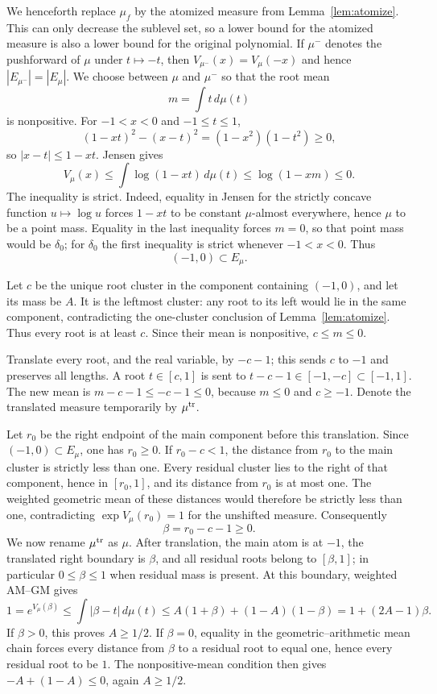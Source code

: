 \documentclass[11pt]{article}
\numberwithin{equation}{section}
\theoremstyle{plain}
\theoremstyle{definition}
\theoremstyle{remark}
\newcommand{\1}{\mathbf 1}
\newcommand{\dd}{\,d}
\begin{document}
We henceforth replace $\mu_f$ by the atomized measure from
Lemma~\ref{lem:atomize}.  This can only decrease the sublevel set, so a
lower bound for the atomized measure is also a lower bound for the original
polynomial.  If $\mu^{-}$ denotes the pushforward of $\mu$ under
$t\mapsto-t$, then $V_{\mu^-}(x)=V_\mu(-x)$ and hence
$|E_{\mu^-}|=|E_\mu|$.  We choose between $\mu$ and $\mu^-$ so that the
root mean
\[
 m=\int t\dd\mu(t)
\]
is nonpositive.  For
$-1<x<0$ and $-1\le t\le1$,
\[
 (1-xt)^2-(x-t)^2=(1-x^2)(1-t^2)\ge0,
\]
so $|x-t|\le1-xt$.  Jensen gives
\[
 V_\mu(x)\le\int\log(1-xt)\dd\mu(t)
 \le\log(1-xm)\le0.
\]
The inequality is strict.  Indeed, equality in Jensen for the strictly
concave function $u\mapsto\log u$ forces $1-xt$ to be constant
$\mu$-almost everywhere, hence $\mu$ to be a point mass.  Equality in the
last inequality forces $m=0$, so that point mass would be $\delta_0$; for
$\delta_0$ the first inequality is strict whenever $-1<x<0$.
Thus
\[
 (-1,0)\subset E_\mu.
\]

Let $c$ be the unique root cluster in the component containing
$(-1,0)$, and let its mass be $A$.  It is the leftmost cluster: any root
to its left would lie in the same component, contradicting the one-cluster
conclusion of Lemma~\ref{lem:atomize}.  Thus every root is at least $c$.
Since their mean is nonpositive, $c\le m\le0$.

Translate every root, and the real variable, by $-c-1$; this sends $c$ to
$-1$ and preserves all lengths.  A root $t\in[c,1]$ is sent to
$t-c-1\in[-1,-c]\subset[-1,1]$.  The new mean is
$m-c-1\le -c-1\le0$, because $m\le0$ and $c\ge-1$.  Denote the translated
measure temporarily by $\mu^{\rm tr}$.

Let $r_0$ be the right endpoint of the main component before this
translation.  Since $(-1,0)\subset E_\mu$, one has
$r_0\ge0$.  If $r_0-c<1$, the distance from $r_0$ to the main cluster is
strictly less than one.  Every residual cluster lies to the right of that
component, hence in $[r_0,1]$, and its distance from $r_0$ is at most one.
The weighted geometric mean of these distances would therefore be strictly
less than one, contradicting $\exp V_\mu(r_0)=1$ for the unshifted measure.
Consequently
\[
 \beta=r_0-c-1\ge0.
\]
We now rename $\mu^{\rm tr}$ as $\mu$.  After translation, the main atom is
at $-1$, the translated right boundary
is $\beta$, and all residual roots belong to $[\beta,1]$; in particular
$0\le\beta\le1$ when residual mass is present.  At this boundary,
weighted AM--GM gives
\[
 1=e^{V_\mu(\beta)}
 \le\int|\beta-t|\dd\mu(t)
 \le A(1+\beta)+(1-A)(1-\beta)
 =1+(2A-1)\beta.
\]
If $\beta>0$, this proves $A\ge1/2$.  If $\beta=0$, equality in the
geometric--arithmetic mean chain forces every distance from $\beta$ to a
residual root to equal one, hence every residual root to be $1$.  The
nonpositive-mean condition then gives
$-A+(1-A)\le0$, again $A\ge1/2$.
\end{document}
